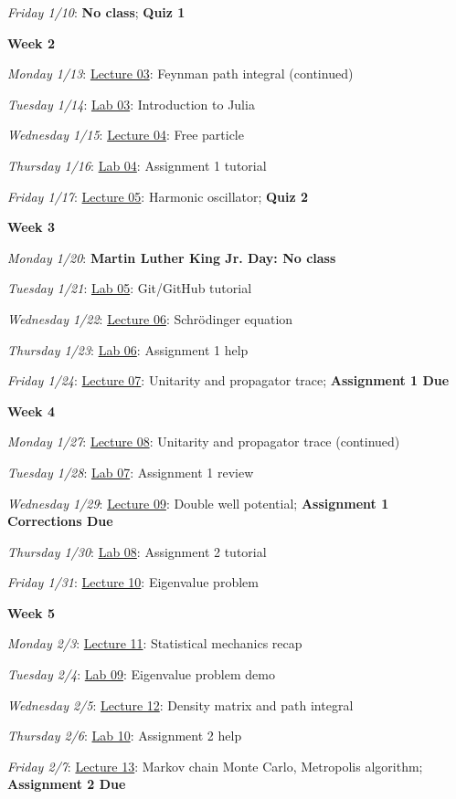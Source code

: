 \documentclass[12pt]{article}
\begin{document}
\emph{Friday 1/10}: \textbf{No class}; \textbf{Quiz 1}

\noindent\textbf{Week 2}

\emph{Monday 1/13}: \underline{Lecture 03}: Feynman path integral (continued)

\emph{Tuesday 1/14}: \underline{Lab 03}: Introduction to Julia

\emph{Wednesday 1/15}: \underline{Lecture 04}: Free particle

\emph{Thursday 1/16}: \underline{Lab 04}: Assignment 1 tutorial

\emph{Friday 1/17}: \underline{Lecture 05}: Harmonic oscillator; \textbf{Quiz 2}

\noindent\textbf{Week 3}

\emph{Monday 1/20}: \textbf{Martin Luther King Jr. Day: No class}

\emph{Tuesday 1/21}: \underline{Lab 05}: Git/GitHub tutorial

\emph{Wednesday 1/22}: \underline{Lecture 06}: Schr\"{o}dinger equation

\emph{Thursday 1/23}: \underline{Lab 06}: Assignment 1 help

\emph{Friday 1/24}: \underline{Lecture 07}: Unitarity and propagator trace; \textbf{Assignment 1 Due}

\noindent\textbf{Week 4}

\emph{Monday 1/27}: \underline{Lecture 08}: Unitarity and propagator trace (continued)

\emph{Tuesday 1/28}: \underline{Lab 07}: Assignment 1 review

\emph{Wednesday 1/29}: \underline{Lecture 09}: Double well potential; \textbf{Assignment 1 Corrections Due}

\emph{Thursday 1/30}: \underline{Lab 08}: Assignment 2 tutorial

\emph{Friday 1/31}: \underline{Lecture 10}: Eigenvalue problem

\noindent\textbf{Week 5}

\emph{Monday 2/3}: \underline{Lecture 11}: Statistical mechanics recap

\emph{Tuesday 2/4}: \underline{Lab 09}: Eigenvalue problem demo

\emph{Wednesday 2/5}: \underline{Lecture 12}: Density matrix and path integral

\emph{Thursday 2/6}: \underline{Lab 10}: Assignment 2 help

\emph{Friday 2/7}: \underline{Lecture 13}: Markov chain Monte Carlo, Metropolis algorithm; \textbf{Assignment 2 Due}
\end{document}
